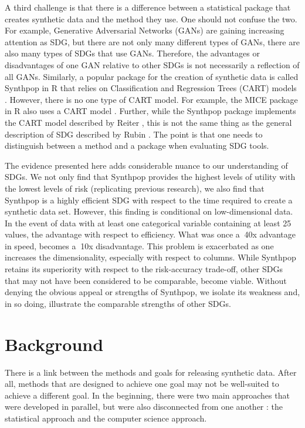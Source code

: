\documentclass[runningheads]{llncs}
\begin{document}
A third challenge is that there is a difference between a statistical package that creates synthetic data and the method they use.  One should not confuse the two.  For example, Generative Adversarial Networks (GANs) are gaining increasing attention as SDG, but there are not only many different types of GANs, there are also many types of SDGs that use GANs.  Therefore, the advantages or disadvantages of one GAN relative to other SDGs is not necessarily a reflection of all GANs.  Similarly, a popular package for the creation of synthetic data is called Synthpop in R that relies on Classification and Regression Trees (CART) models \citep{nowok2016synthpop}.  However, there is no one type of CART model.  For example, the MICE package in R also uses a CART model \citep{van2011mice}.  Further, while the Synthpop package implements the CART model described by Reiter \cite{reiter2005using}, this is not the same thing as the general description of SDG described by Rubin \cite{rubin1993statistical}.  The point is that one needs to distinguish between a method and a package when evaluating SDG tools.

The evidence presented here adds considerable nuance to our understanding of SDGs.  We not only find that Synthpop provides the highest levels of utility with the lowest levels of risk (replicating previous research), we also find that Synthpop is a highly efficient SDG with respect to the time required to create a synthetic data set.  However, this finding is conditional on low-dimensional data.  In the event of data with at least one categorical variable containing at least 25 values, the advantage with respect to efficiency.  What was once a $~$40x advantage in speed, becomes a $~$10x disadvantage.  This problem is exacerbated as one increases the dimensionality, especially with respect to columns.  While Synthpop retains its superiority with respect to the risk-accuracy trade-off, other SDGs that may not have been considered to be comparable, become viable.  Without denying the obvious appeal or strengths of Synthpop, we isolate its weakness and, in so doing, illustrate the comparable strengths of other SDGs.

\section{Background}

There is a link between the methods and goals for releasing synthetic data.  After all, methods that are designed to achieve one goal may not be well-suited to achieve a different goal.  In the beginning, there were two main approaches that were developed in parallel, but were also disconnected from one another \citep{drechsler202330}: the statistical approach and the computer science approach.  
\end{document}
